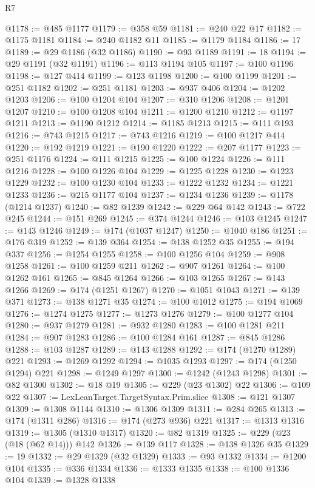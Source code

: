 \begin{lexlean}{R7}
\begin{coremodule}
@1178 := @485 @1177
@1179 := @358 @59
@1181 := @240 @22 @17
@1182 := @1175 @1181
@1184 := @240 @1182 @11
@1185 := @1179 @1184
@1186 := 17
@1189 := @29 @1186 (@32 @1186)
@1190 := @93 @1189
@1191 := 18
@1194 := @29 @1191 (@32 @1191)
@1196 := @113 @1194 @105
@1197 := @100 @1196
@1198 := @127 @414
@1199 := @123 @1198
@1200 := @100 @1199
@1201 := @251 @1182
@1202 := @251 @1181
@1203 := @937 @406
@1204 := @1202 @1203
@1206 := @100 @1204 @104
@1207 := @310 @1206
@1208 := @1201 @1207
@1210 := @100 @1208 @104
@1211 := @1200 @1210
@1212 := @1197 @1211
@1213 := @1190 @1212
@1214 := @1185 @1213
@1215 := @111 @193
@1216 := @743 @1215
@1217 := @743 @1216
@1219 := @100 @1217 @414
@1220 := @192 @1219
@1221 := @190 @1220
@1222 := @207 @1177
@1223 := @251 @1176
@1224 := @111 @1215
@1225 := @100 @1224
@1226 := @111 @1216
@1228 := @100 @1226 @104
@1229 := @1225 @1228
@1230 := @1223 @1229
@1232 := @100 @1230 @104
@1233 := @1222 @1232
@1234 := @1221 @1233
@1236 := @215 @1177 @104
@1237 := @1234 @1236
@1239 := @1178 (@1214 @1237)
@1240 := @82 @1239
@1242 := @229 @64 @142
@1243 := @722 @245
@1244 := @151 @269
@1245 := @374 @1244
@1246 := @103 @1245
@1247 := @143 @1246
@1249 := @174 (@1037 @1247)
@1250 := @1040 @186
@1251 := @176 @319
@1252 := @139 @364
@1254 := @138 @1252 @35
@1255 := @194 @337
@1256 := @1254 @1255
@1258 := @100 @1256 @104
@1259 := @908 @1258
@1261 := @100 @1259 @211
@1262 := @907 @1261
@1264 := @100 @1262 @161
@1265 := @845 @1264
@1266 := @103 @1265
@1267 := @143 @1266
@1269 := @174 (@1251 @1267)
@1270 := @1051 @1043
@1271 := @139 @371
@1273 := @138 @1271 @35
@1274 := @100 @1012
@1275 := @194 @1069
@1276 := @1274 @1275
@1277 := @1273 @1276
@1279 := @100 @1277 @104
@1280 := @937 @1279
@1281 := @932 @1280
@1283 := @100 @1281 @211
@1284 := @907 @1283
@1286 := @100 @1284 @161
@1287 := @845 @1286
@1288 := @103 @1287
@1289 := @143 @1288
@1292 := @174 (@1270 @1289) @221
@1293 := @1269 @1292
@1294 := @1035 @1293
@1297 := @174 (@1250 @1294) @221
@1298 := @1249 @1297
@1300 := @1242 (@1243 @1298)
@1301 := @82 @1300
@1302 := @18 @19
@1305 := @229 (@23 @1302) @22
@1306 := @109 @22
@1307 := LexLeanTarget.TargetSyntax.Prim.slice
@1308 := @121 @1307
@1309 := @1308 @1144
@1310 := @1306 @1309
@1311 := @284 @265
@1313 := @174 (@1311 @286)
@1316 := @174 (@273 @936) @221
@1317 := @1313 @1316
@1319 := @1305 (@1310 @1317)
@1320 := @82 @1319
@1325 := @229 (@23 (@18 (@62 @14))) @142
@1326 := @139 @117
@1328 := @138 @1326 @35
@1329 := 19
@1332 := @29 @1329 (@32 @1329)
@1333 := @93 @1332
@1334 := @1200 @104
@1335 := @336 @1334
@1336 := @1333 @1335
@1338 := @100 @1336 @104
@1339 := @1328 @1338

\end{coremodule}
\end{lexlean}
